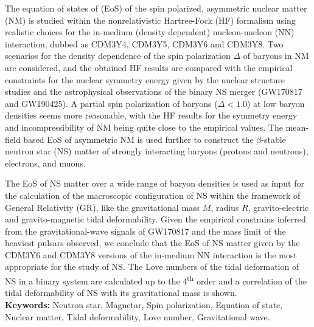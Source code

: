 The equation of states of (\gls{EoS}) of the spin polarized, asymmetric nuclear matter (\gls{NM}) 
is studied within the nonrelativistic Hartree-Fock (\gls{HF}) formalism using realistic choices 
for the in-medium (density dependent) nucleon-nucleon (\gls{NN}) interaction, dubbed as CDM3Y4, CDM3Y5, 
CDM3Y6 and CDM3Y8. Two scenarios for the density dependence of the spin polarization $\Delta$ 
of baryons in NM are considered, and the obtained HF results are compared with the empirical 
constraints for the nuclear symmetry energy given by the nuclear structure studies and the 
astrophysical observations of the binary NS merger (GW170817 and GW190425). A partial spin 
polarization of baryons ($\Delta < 1.0$) at low baryon densities seems more reasonable, with 
the HF results for the symmetry energy and incompressibility of NM being quite close to the 
empirical values. The mean-field based EoS of asymmetric NM is used further to construct 
the $\beta$-stable neutron star (\gls{NS}) matter of strongly interacting baryons (protons 
and neutrons), electrons, and muons. \par\noindent
The EoS of NS matter over a wide range of baryon densities is used as input for the calculation 
of the macroscopic configuration of \gls{NS} within the framework of General Relativity (\gls{GR}), 
like the gravitational mass $M$, radius $R$, gravito-electric and gravito-magnetic tidal deformability. 
Given the empirical constrains inferred from the gravitational-wave signals of GW170817 and the mass 
limit of the heaviest pulsars observed, we conclude that the EoS of NS matter given by the CDM3Y6 
and CDM3Y8 versions of the in-medium NN interaction is the most appropriate for the study of NS. 
The Love numbers of the tidal deformation of \gls{NS} in a binary system are calculated up 
to the 4\textsuperscript{th} order and a correlation of the tidal deformability of NS with 
its gravitational mass is shown. \\ [5mm]
\textbf{Keywords:} Neutron star, Magnetar, Spin polarization, Equation of state, Nuclear matter, 
Tidal deformability, Love number, Gravitational wave.
